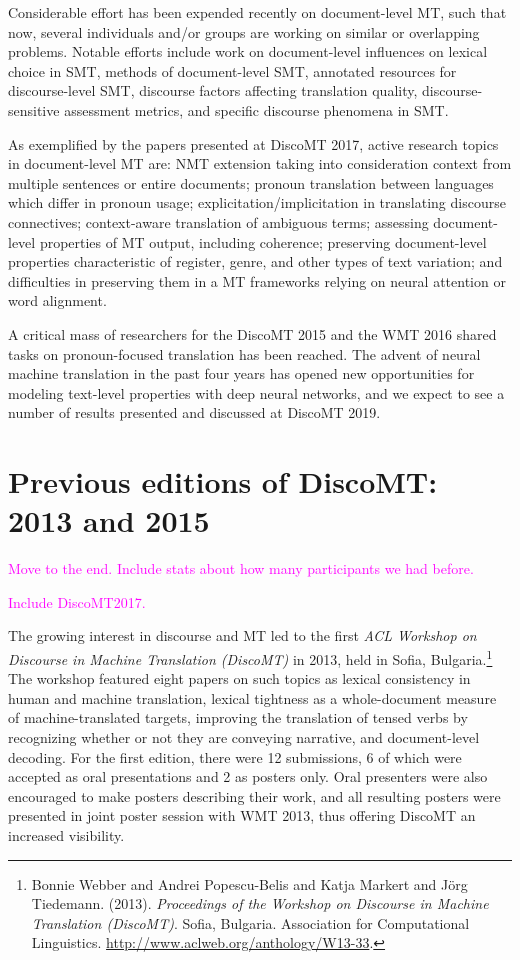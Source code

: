 \documentclass[11pt]{article}
\begin{document}
Considerable effort has been expended recently on document-level MT, such that now, several
individuals and/or groups are working on similar or overlapping problems.
Notable efforts include work on document-level influences on lexical choice in SMT, methods of document-level
SMT, annotated resources for discourse-level SMT, discourse factors affecting translation quality,
discourse-sensitive assessment metrics, and specific discourse phenomena in SMT.

As exemplified by the papers presented at DiscoMT 2017, active research topics in document-level MT are: 
NMT extension taking into consideration context from multiple sentences or
entire documents;
pronoun translation between languages which differ in pronoun usage; 
explicitation/implicitation in translating discourse connectives; 
context-aware translation of ambiguous terms; assessing document-level properties of MT
output, including coherence; preserving document-level
properties characteristic of register, genre, and other types of text variation; and difficulties 
in preserving them in a MT frameworks relying on neural attention or word
alignment.

A critical mass of researchers for the DiscoMT 2015 and the WMT 2016 shared tasks
on pronoun-focused translation has been reached.  The advent of neural machine 
translation in the past four years has opened new opportunities for modeling 
text-level properties with deep neural networks, and we expect to see a number
of results presented and discussed at DiscoMT 2019.


\section{Previous editions of DiscoMT: 2013 and 2015}

\textcolor{magenta}{Move to the end. Include stats about how many participants we had before.} 

\textcolor{magenta}{Include DiscoMT2017.} 

The growing interest in discourse and MT led to the first
\textit{ACL Workshop on Discourse in Machine Translation (DiscoMT)} in 2013,
held in Sofia, Bulgaria.\footnote{Bonnie Webber  and  Andrei Popescu-Belis  and  Katja Markert  and  J\"{o}rg Tiedemann. (2013). \textit{Proceedings of the Workshop on Discourse in Machine Translation (DiscoMT)}. Sofia, Bulgaria. Association for Computational Linguistics. \url{http://www.aclweb.org/anthology/W13-33}.}
The workshop
featured eight papers on such topics as lexical consistency in human and
machine translation, lexical tightness as a whole-document
measure of machine-translated targets, improving
the translation of tensed verbs by recognizing whether or not they are
conveying narrative, and document-level decoding.  For the first edition,
there were 12 submissions, 6 of which were accepted as oral presentations and
2 as posters only.  Oral presenters were also encouraged to make posters
describing their work, and all resulting posters were presented in joint
poster session with WMT 2013, thus offering DiscoMT an increased visibility.
\end{document}
